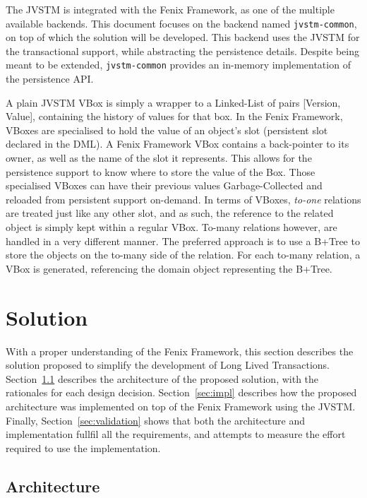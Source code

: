 \documentclass{llncs}
\begin{document}
The JVSTM is integrated with the Fenix Framework, as one of the
multiple available backends. This document focuses on the backend
named \texttt{jvstm-common}, on top of which the solution will be
developed. This backend uses the JVSTM for the transactional support,
while abstracting the persistence details. Despite being meant to be
extended, \texttt{jvstm-common} provides an in-memory implementation
of the persistence API.

A plain JVSTM VBox is simply a wrapper to a Linked-List of pairs
[Version, Value], containing the history of values for that box. In
the Fenix Framework, VBoxes are specialised to hold the value of an
object's slot (persistent slot declared in the DML). A Fenix Framework
VBox contains a back-pointer to its owner, as well as the name of the
slot it represents. This allows for the persistence support to know
where to store the value of the Box.  Those specialised VBoxes can
have their previous values Garbage-Collected and reloaded from
persistent support on-demand. In terms of VBoxes, {\it to-one}
relations are treated just like any other slot, and as such, the
reference to the related object is simply kept within a regular
VBox. To-many relations however, are handled in a very different
manner. The preferred approach is to use a B+Tree
\cite{elmasri2009fundamentals} to store the objects on the to-many
side of the relation. For each to-many relation, a VBox is generated,
referencing the domain object representing the B+Tree.


\section{Solution}
\label{chap:solution}

With a proper understanding of the Fenix Framework, this section
describes the solution proposed to simplify the development of Long
Lived Transactions. Section~\ref{sec:arch} describes the architecture
of the proposed solution, with the rationales for each design
decision. Section~\ref{sec:impl} describes how the proposed
architecture was implemented on top of the Fenix Framework using the
JVSTM. Finally, Section~\ref{sec:validation} shows that both the
architecture and implementation fullfil all the requirements, and
attempts to measure the effort required to use the implementation.

\subsection{Architecture}
\label{sec:arch}
\end{document}
